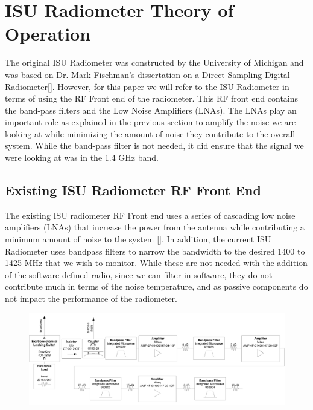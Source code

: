 \section{ISU Radiometer Theory of Operation}
The original ISU Radiometer was constructed by the University of Michigan and was based on Dr. Mark Fischman's dissertation on a Direct-Sampling Digital Radiometer[\cite{Fischman2001}].  However, for this paper we will refer to the ISU Radiometer in terms of using the RF Front end of the radiometer.  This RF front end contains the band-pass filters and the Low Noise Amplifiers (LNAs).  The LNAs play an important role as explained in the previous section to amplify the noise we are looking at while minimizing the amount of noise they contribute to the overall system.  While the band-pass filter is not needed, it did ensure that the signal we were looking at was in the 1.4 GHz band.

\subsection{Existing ISU Radiometer RF Front End}

The existing ISU radiometer RF Front end uses a series of cascading low noise amplifiers (LNAs) that increase the power from the antenna while contributing a minimum amount of noise to the system [\cite{Erbas}].  In addition, the current ISU Radiometer uses bandpass filters to narrow the bandwidth to the desired 1400 to 1425 MHz that we wish to monitor.  While these are not needed with the addition of the software defined radio, since we can filter in software, they do not contribute much in terms of the noise temperature, and as passive components do not impact the performance of the radiometer.

{\begin{figure}[h!tb] 
\centering
\includegraphics[width=17cm]{Images/ISU_rf_block.png}
\label{ISU_rf_block}
\end{figure}
}

